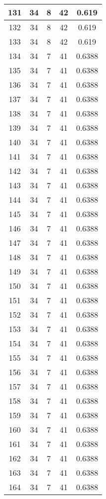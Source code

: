 \documentclass[letterpaper, 12pt]{article}
\begin{document}
\begin{longtable}{|c|c|c|c|c|}
\hline
131 & 34 & 8 & 42 & 0.619 \\
\hline
132 & 34 & 8 & 42 & 0.619 \\
\hline
133 & 34 & 8 & 42 & 0.619 \\
\hline
134 & 34 & 7 & 41 & 0.6388 \\
\hline
135 & 34 & 7 & 41 & 0.6388 \\
\hline
136 & 34 & 7 & 41 & 0.6388 \\
\hline
137 & 34 & 7 & 41 & 0.6388 \\
\hline
138 & 34 & 7 & 41 & 0.6388 \\
\hline
139 & 34 & 7 & 41 & 0.6388 \\
\hline
140 & 34 & 7 & 41 & 0.6388 \\
\hline
141 & 34 & 7 & 41 & 0.6388 \\
\hline
142 & 34 & 7 & 41 & 0.6388 \\
\hline
143 & 34 & 7 & 41 & 0.6388 \\
\hline
144 & 34 & 7 & 41 & 0.6388 \\
\hline
145 & 34 & 7 & 41 & 0.6388 \\
\hline
146 & 34 & 7 & 41 & 0.6388 \\
\hline
147 & 34 & 7 & 41 & 0.6388 \\
\hline
148 & 34 & 7 & 41 & 0.6388 \\
\hline
149 & 34 & 7 & 41 & 0.6388 \\
\hline
150 & 34 & 7 & 41 & 0.6388 \\
\hline
151 & 34 & 7 & 41 & 0.6388 \\
\hline
152 & 34 & 7 & 41 & 0.6388 \\
\hline
153 & 34 & 7 & 41 & 0.6388 \\
\hline
154 & 34 & 7 & 41 & 0.6388 \\
\hline
155 & 34 & 7 & 41 & 0.6388 \\
\hline
156 & 34 & 7 & 41 & 0.6388 \\
\hline
157 & 34 & 7 & 41 & 0.6388 \\
\hline
158 & 34 & 7 & 41 & 0.6388 \\
\hline
159 & 34 & 7 & 41 & 0.6388 \\
\hline
160 & 34 & 7 & 41 & 0.6388 \\
\hline
161 & 34 & 7 & 41 & 0.6388 \\
\hline
162 & 34 & 7 & 41 & 0.6388 \\
\hline
163 & 34 & 7 & 41 & 0.6388 \\
\hline
164 & 34 & 7 & 41 & 0.6388 \\

\end{longtable}
\end{document}

